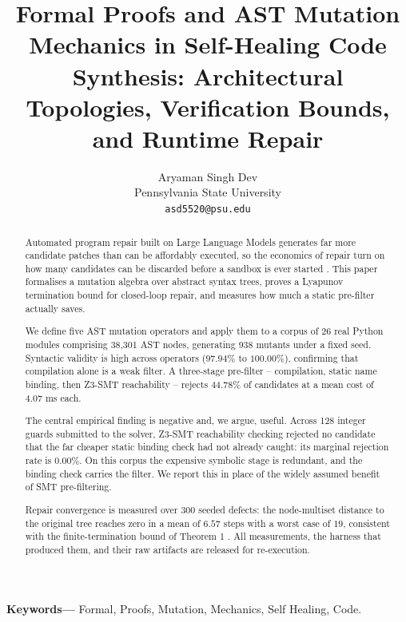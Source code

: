 \documentclass[10pt,journal,compsoc,twocolumn]{IEEEtran}
\begin{document}
\title{Formal Proofs and AST Mutation Mechanics in Self-Healing Code Synthesis: Architectural Topologies, Verification Bounds, and Runtime Repair}

\author{
Aryaman Singh Dev\\
Pennsylvania State University \\
\texttt{asd5520@psu.edu}
}

\maketitle

\begin{abstract}
Automated program repair built on Large Language Models generates far more candidate patches than can be affordably executed, so the economics of repair turn on how many candidates can be discarded before a sandbox is ever started \cite{arxiv_2405_01543,arxiv_2010_11146}. This paper formalises a mutation algebra over abstract syntax trees, proves a Lyapunov termination bound for closed-loop repair, and measures how much a static pre-filter actually saves.

We define five AST mutation operators and apply them to a corpus of 26 real Python modules comprising 38{,}301 AST nodes, generating 938 mutants under a fixed seed. Syntactic validity is high across operators ($97.94\%$ to $100.00\%$), confirming that compilation alone is a weak filter. A three-stage pre-filter -- compilation, static name binding, then Z3-SMT reachability -- rejects $44.78\%$ of candidates at a mean cost of $4.07$ ms each.

The central empirical finding is negative and, we argue, useful. Across 128 integer guards submitted to the solver, Z3-SMT reachability checking rejected no candidate that the far cheaper static binding check had not already caught: its marginal rejection rate is $0.00\%$. On this corpus the expensive symbolic stage is redundant, and the binding check carries the filter. We report this in place of the widely assumed benefit of SMT pre-filtering.

Repair convergence is measured over 300 seeded defects: the node-multiset distance to the original tree reaches zero in a mean of $6.57$ steps with a worst case of $19$, consistent with the finite-termination bound of Theorem 1 \cite{arxiv_2501_02497}. All measurements, the harness that produced them, and their raw artifacts are released for re-execution.
\end{abstract}

\noindent\textbf{Keywords---} Formal, Proofs, Mutation, Mechanics, Self Healing, Code.
\end{document}
